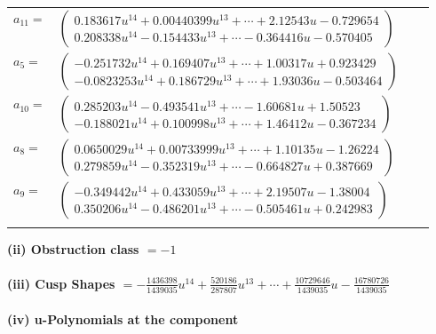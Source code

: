 \documentclass[1p]{elsarticle_modified}
\theoremstyle{definition}
\begin{document}
\begin{tabular}{m{7pt} m{180pt} m{7pt} m{180pt} }
\flushright $a_{11}=$&$\begin{pmatrix}0.183617 u^{14}+0.00440399 u^{13}+\cdots+2.12543 u-0.729654\\0.208338 u^{14}-0.154433 u^{13}+\cdots-0.364416 u-0.570405\end{pmatrix}$ \\
\flushright $a_{5}=$&$\begin{pmatrix}-0.251732 u^{14}+0.169407 u^{13}+\cdots+1.00317 u+0.923429\\-0.0823253 u^{14}+0.186729 u^{13}+\cdots+1.93036 u-0.503464\end{pmatrix}$ \\
\flushright $a_{10}=$&$\begin{pmatrix}0.285203 u^{14}-0.493541 u^{13}+\cdots-1.60681 u+1.50523\\-0.188021 u^{14}+0.100998 u^{13}+\cdots+1.46412 u-0.367234\end{pmatrix}$ \\
\flushright $a_{8}=$&$\begin{pmatrix}0.0650029 u^{14}+0.00733999 u^{13}+\cdots+1.10135 u-1.26224\\0.279859 u^{14}-0.352319 u^{13}+\cdots-0.664827 u+0.387669\end{pmatrix}$ \\
\flushright $a_{9}=$&$\begin{pmatrix}-0.349442 u^{14}+0.433059 u^{13}+\cdots+2.19507 u-1.38004\\0.350206 u^{14}-0.486201 u^{13}+\cdots-0.505461 u+0.242983\end{pmatrix}$\\&\end{tabular}
\flushleft \textbf{(ii) Obstruction class $= -1$}\\~\\
\flushleft \textbf{(iii) Cusp Shapes $= -\frac{1436398}{1439035} u^{14}+\frac{520186}{287807} u^{13}+\cdots+\frac{10729646}{1439035} u-\frac{16780726}{1439035}$}\\~\\
\newpage\renewcommand{\arraystretch}{1}
\flushleft \textbf{(iv) u-Polynomials at the component}\newline \\
\end{document}
